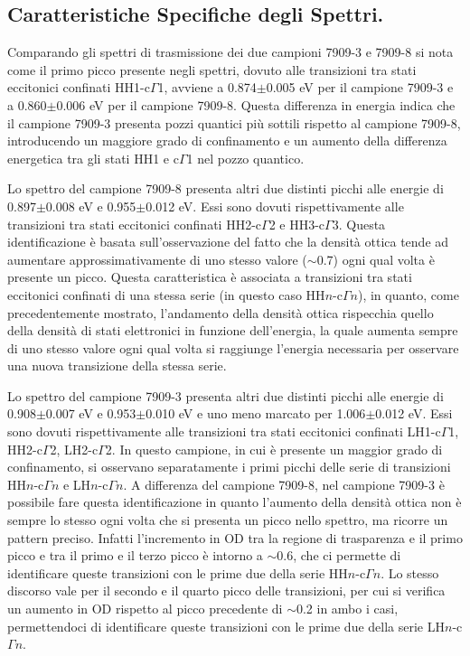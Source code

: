 \documentclass[journal]{IEEEtran}
\begin{document}
\subsection{Caratteristiche Specifiche degli Spettri.}

Comparando gli spettri di trasmissione dei due campioni 7909-3 e 7909-8 si nota come il primo picco presente negli spettri, dovuto alle transizioni tra stati eccitonici confinati HH1-c$\Gamma$1, avviene a 0.874$\pm$0.005 eV per il campione 7909-3 e a 0.860$\pm$0.006 eV per il campione 7909-8.
Questa differenza in energia indica che il campione 7909-3 presenta pozzi quantici più sottili rispetto al campione 7909-8, introducendo un maggiore grado di confinamento e un aumento della differenza energetica tra gli stati HH1 e c$\Gamma$1 nel pozzo quantico.

Lo spettro del campione 7909-8 presenta altri due distinti picchi alle energie di 0.897$\pm$0.008 eV e 0.955$\pm$0.012 eV. Essi sono dovuti rispettivamente alle transizioni tra stati eccitonici confinati HH2-c$\Gamma$2 e HH3-c$\Gamma$3. Questa identificazione è basata sull'osservazione del fatto che la densità ottica tende ad aumentare approssimativamente di uno stesso valore ($\sim$0.7) ogni qual volta è presente un picco. Questa caratteristica è associata a transizioni tra stati eccitonici confinati di una stessa serie (in questo caso HH$\textit{n}$-c$\Gamma\textit{n}$), in quanto, come precedentemente mostrato, l'andamento della densità ottica rispecchia quello della densità di stati elettronici in funzione dell'energia, la quale aumenta sempre di uno stesso valore ogni qual volta si raggiunge l'energia necessaria per osservare una nuova transizione della stessa serie.

Lo spettro del campione 7909-3 presenta altri due distinti picchi alle energie di 0.908$\pm$0.007 eV e 0.953$\pm$0.010 eV e uno meno marcato per 1.006$\pm$0.012 eV. Essi sono dovuti rispettivamente alle transizioni tra stati eccitonici confinati LH1-c$\Gamma$1, HH2-c$\Gamma$2, LH2-c$\Gamma$2. In questo campione, in cui è presente un maggior grado di confinamento, si osservano separatamente i primi picchi delle serie di transizioni HH$\textit{n}$-c$\Gamma\textit{n}$ e LH$\textit{n}$-c$\Gamma\textit{n}$. A differenza del campione 7909-8, nel campione 7909-3 è possibile fare questa identificazione in quanto l'aumento della densità ottica non è sempre lo stesso ogni volta che si presenta un picco nello spettro, ma ricorre un pattern preciso. Infatti l'incremento in OD tra la regione di trasparenza e il primo picco e tra il primo e il terzo picco è intorno a $\sim$0.6, che ci permette di identificare queste transizioni con 
le prime due della serie HH$\textit{n}$-c$\Gamma\textit{n}$. Lo stesso discorso vale per il secondo e il quarto picco delle transizioni, per cui si verifica un aumento in OD rispetto al picco precedente di $\sim$0.2 in ambo i casi, permettendoci di identificare queste transizioni con le prime due della serie LH$\textit{n}$-c$\Gamma\textit{n}$.
\end{document}

